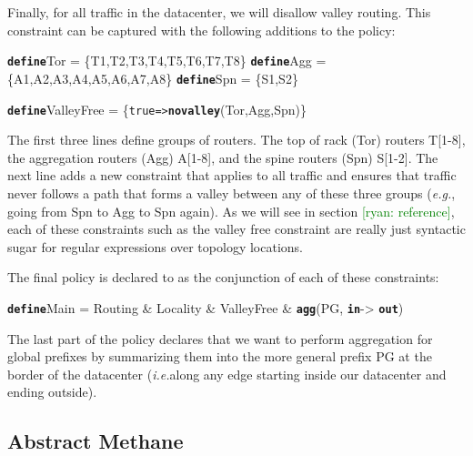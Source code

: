 \documentclass{sig-alternate-10pt}
\newcommand{\ryan}[1]{\textcolor{green}{[ryan: #1]}}
\newcommand{\EG}{\emph{e.g.}}
\newcommand{\IE}{\emph{i.e.}}
\newcommand{\CD}[1]{\texttt{\small #1}}  %
\newcommand{\KW}[1]{\texttt{\small\bfseries{#1}}}
\newcommand{\True}{\CD{true}}
\newcommand{\Define}{\KW{define}}
\newcommand{\Path}{\texttt{=>}}
\newcommand{\Agg}{\KW{agg}}
\newcommand{\In}{\KW{in}}
\newcommand{\Out}{\KW{out}}
\newcommand{\Novalley}{\KW{novalley}}
\begin{document}
Finally, for all traffic in the datacenter, we will disallow valley routing. This constraint
can be captured with the following additions to the policy:
%
\begin{code}
\Define Tor = \{T1,T2,T3,T4,T5,T6,T7,T8\}
\Define Agg = \{A1,A2,A3,A4,A5,A6,A7,A8\}
\Define Spn = \{S1,S2\}

\Define ValleyFree =
    \{\True \Path \Novalley(Tor,Agg,Spn)\}
\end{code}
\noindent%

The first three lines define groups of routers. The top of rack (Tor) routers T[1-8], the 
aggregation routers (Agg) A[1-8], and the spine routers (Spn) S[1-2]. The next line 
adds a new constraint that applies to all traffic and ensures that traffic never follows a 
path that forms a valley between any of these three groups (\EG, going from Spn to Agg to Spn again).
As we will see in section \ryan{reference}, each of these constraints such as the valley free constraint
are really just syntactic sugar for regular expressions over topology locations.

The final policy is declared to as the conjunction of each of these constraints:
%
\begin{code}
\Define Main = 
    Routing & 
    Locality & 
    ValleyFree & 
    \Agg(PG, \In -> \Out)
\end{code}
\noindent%
The last part of the policy declares that we want to perform aggregation for global prefixes
by summarizing them into the more general prefix PG at the border of the datacenter
(\IE along any edge starting inside our datacenter and ending outside).

\subsection{Abstract Methane}
\end{document}
